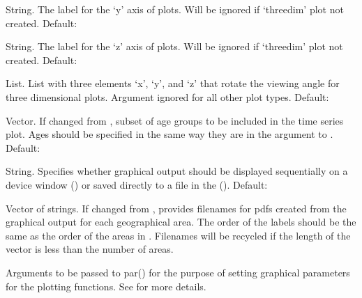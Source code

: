 \begin{Arguments}
\begin{ldescription}
\item[\code{threedim.ylab}] String. The label for the `y' axis of
 plots. Will be ignored if `threedim' plot
not created.  Default: 

\item[\code{threedim.zlab}] String. The label for the `z' axis of
 plots. Will be ignored if `threedim' plot
not created.  Default: 

\item[\code{screen}] List. List with three elements `x', `y',
and `z' that rotate the viewing angle for three dimensional
plots. Argument ignored for all other plot types. 
Default: 

\item[\code{age.incl}] Vector. If changed from , subset of age groups
to be included in the time series plot. Ages should be specified in
the same way they are in the  argument to
. Default: 

\item[\code{print}] String. Specifies whether graphical output should be
displayed sequentially on a device window () or saved
directly to a  file in the  (). 
Default: 

\item[\code{filename}] Vector of strings. If changed from , provides
filenames for pdfs created from the graphical output for each
geographical area. The order of the labels should be the same as the
order of the areas in . Filenames will be recycled
if the length of the vector is less than the number of areas.

\item[\code{...}] Arguments to be passed to par() for the purpose of setting
graphical parameters for the plotting functions. See
 for more details. 

\end{ldescription}
\end{Arguments}
%
